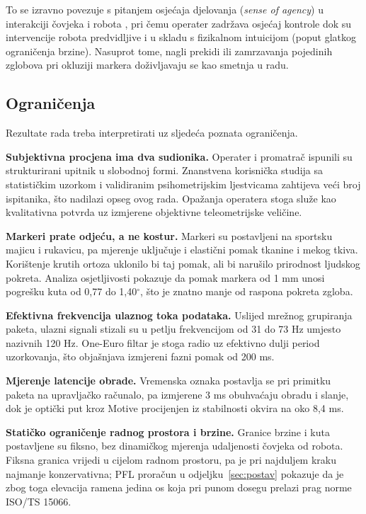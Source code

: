 To se izravno povezuje s pitanjem osjećaja djelovanja (\emph{sense of agency}) u interakciji čovjeka i robota \cite[str.~1]{glawe2026}, pri čemu operater zadržava osjećaj kontrole dok su intervencije robota predvidljive i u skladu s fizikalnom intuicijom (poput glatkog ograničenja brzine). Nasuprot tome, nagli prekidi ili zamrzavanja pojedinih zglobova pri okluziji markera doživljavaju se kao smetnja u radu.

\subsection{Ograničenja}

Rezultate rada treba interpretirati uz sljedeća poznata ograničenja.

\textbf{Subjektivna procjena ima dva sudionika.} Operater i promatrač ispunili su strukturirani upitnik u slobodnoj formi. Znanstvena korisnička studija sa statističkim uzorkom i validiranim psihometrijskim ljestvicama zahtijeva veći broj ispitanika, što nadilazi opseg ovog rada. Opažanja operatera stoga služe kao kvalitativna potvrda uz izmjerene objektivne teleometrijske veličine.

\textbf{Markeri prate odjeću, a ne kostur.} Markeri su postavljeni na sportsku majicu i rukavicu, pa mjerenje uključuje i elastični pomak tkanine i mekog tkiva. Korištenje krutih ortoza uklonilo bi taj pomak, ali bi narušilo prirodnost ljudskog pokreta. Analiza osjetljivosti pokazuje da pomak markera od 1 mm unosi pogrešku kuta od 0,77 do 1,40$^\circ$, što je znatno manje od raspona pokreta zgloba.

\textbf{Efektivna frekvencija ulaznog toka podataka.} Uslijed mrežnog grupiranja paketa, ulazni signali stizali su u petlju frekvencijom od 31 do 73 Hz umjesto nazivnih 120 Hz. One-Euro filtar je stoga radio uz efektivno dulji period uzorkovanja, što objašnjava izmjereni fazni pomak od 200 ms.

\textbf{Mjerenje latencije obrade.} Vremenska oznaka postavlja se pri primitku paketa na upravljačko računalo, pa izmjerene 3 ms obuhvaćaju obradu i slanje, dok je optički put kroz Motive procijenjen iz stabilnosti okvira na oko 8,4 ms.

\textbf{Statičko ograničenje radnog prostora i brzine.} Granice brzine i kuta postavljene su fiksno, bez dinamičkog mjerenja udaljenosti čovjeka od robota. Fiksna granica vrijedi u cijelom radnom prostoru, pa je pri najduljem kraku najmanje konzervativna; PFL proračun u odjeljku~\ref{sec:postav} pokazuje da je zbog toga elevacija ramena jedina os koja pri punom dosegu prelazi prag norme ISO/TS 15066.

\FloatBarrier
